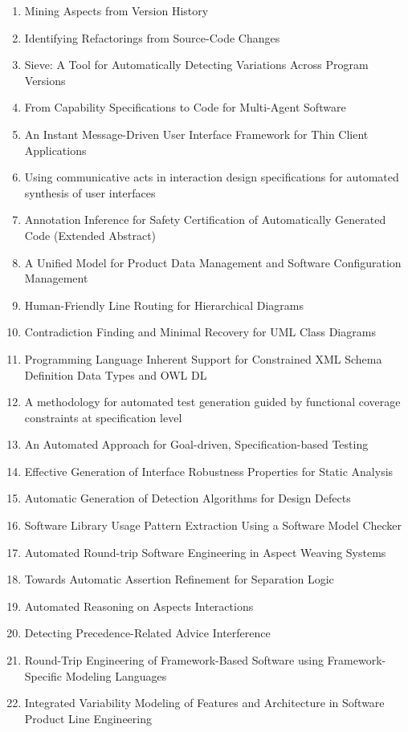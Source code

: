 \begin{enumerate}[itemsep=-1ex]
  \item Mining Aspects from Version History
  \item Identifying Refactorings from Source-Code Changes
  \item Sieve: A Tool for Automatically Detecting Variations Across Program Versions
  \item From Capability Specifications to Code for Multi-Agent Software
  \item An Instant Message-Driven User Interface Framework for Thin Client Applications
  \item Using communicative acts in interaction design specifications for automated synthesis of user interfaces
  \item Annotation Inference for Safety Certification of Automatically Generated Code (Extended Abstract)
  \item A Unified Model for Product Data Management and Software Configuration Management
  \item Human-Friendly Line Routing for Hierarchical Diagrams
  \item Contradiction Finding and Minimal Recovery for UML Class Diagrams
  \item Programming Language Inherent Support for Constrained XML Schema Definition Data Types and OWL DL
  \item A methodology for automated test generation guided by functional coverage constraints at specification level
  \item An Automated Approach for Goal-driven, Specification-based Testing
  \item Effective Generation of Interface Robustness Properties for Static Analysis
  \item Automatic Generation of Detection Algorithms for Design Defects
  \item Software Library Usage Pattern Extraction Using a Software Model Checker
  \item Automated Round-trip Software Engineering in Aspect Weaving Systems
  \item Towards Automatic Assertion Refinement for Separation Logic
  \item Automated Reasoning on Aspects Interactions
  \item Detecting Precedence-Related Advice Interference
  \item Round-Trip Engineering of Framework-Based Software using Framework-Specific Modeling Languages
  \item Integrated Variability Modeling of Features and Architecture in Software Product Line Engineering

\end{enumerate}
